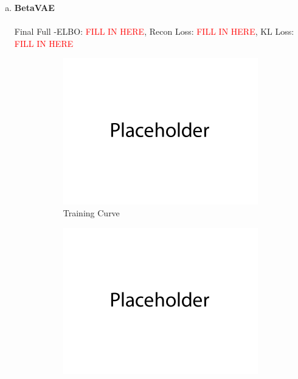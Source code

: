 \documentclass{article}
\begin{document}
\begin{enumerate}[(a)]
     \newpage


        \item {\bf BetaVAE} \\\\
       Final Full -ELBO: \textcolor{red}{FILL IN HERE}, Recon Loss: \textcolor{red}{FILL IN HERE}, KL Loss: \textcolor{red}{FILL IN HERE}
        \begin{figure}[H]
               \centering
               \begin{subfigure}[b]{0.475\textwidth}
                   \centering
                   \includegraphics[width=\textwidth]{figures/q2_b_train_plot.png}
                   \caption{Training Curve}
               \end{subfigure}
               \hfill
               \begin{subfigure}[b]{0.475\textwidth}
                   \centering
                   \includegraphics[width=\textwidth]{figures/q2_b_samples.png}

\end{subfigure}
\end{figure}
\end{enumerate}
\end{document}
